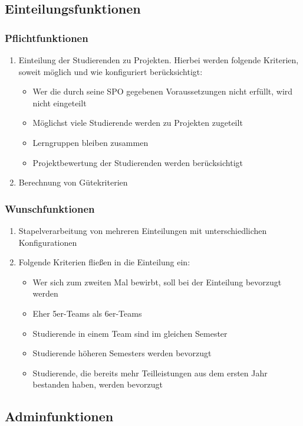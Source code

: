 \documentclass[parskip=full]{scrartcl}
\newcommand{\swtLabel}[1]{\textbf{/#1\arabic*0/}}
\begin{document}
\subsection{Einteilungsfunktionen}
\subsubsection{Pflichtfunktionen}
\begin{enumerate}[label=\swtLabel{FA}]
  \item Einteilung der Studierenden zu Projekten. Hierbei werden folgende Kriterien,
soweit möglich und wie konfiguriert berücksichtigt:
\begin{itemize}
  \item Wer die durch seine SPO gegebenen Voraussetzungen nicht erfüllt, wird nicht
eingeteilt
\item Möglichst viele Studierende werden zu Projekten zugeteilt
\item Lerngruppen bleiben zusammen
\item Projektbewertung der Studierenden werden berücksichtigt
\end{itemize}
\item Berechnung von Gütekriterien
\end{enumerate}
\subsubsection{Wunschfunktionen}
\begin{enumerate}[label=\swtLabel{FA}, resume]
  \item Stapelverarbeitung von mehreren Einteilungen mit unterschiedlichen Konfigurationen
\item Folgende Kriterien fließen in die Einteilung ein:
\begin{itemize}
  \item Wer sich zum zweiten Mal bewirbt, soll bei der Einteilung bevorzugt
  werden
  \item Eher 5er-Teams als 6er-Teams
  \item Studierende in einem Team sind im gleichen Semester
  \item Studierende höheren Semesters werden bevorzugt
  \item Studierende, die bereits mehr Teilleistungen aus dem ersten Jahr bestanden
haben, werden bevorzugt
\end{itemize}
\end{enumerate}
\subsection{Adminfunktionen}
\end{document}

